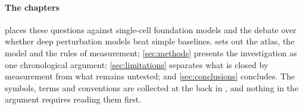 \paragraph{The chapters}  places these questions against
single-cell foundation models and the debate over whether deep perturbation
models beat simple baselines.  sets out the atlas, the
model and the rules of measurement; \cref{sec:methods} presents the investigation
as one chronological argument; \cref{sec:limitations} separates what is closed by
measurement from what remains untested; and \cref{sec:conclusions} concludes. The
symbols, terms and conventions are collected at the back in ,
and nothing in the argument requires reading them first.
